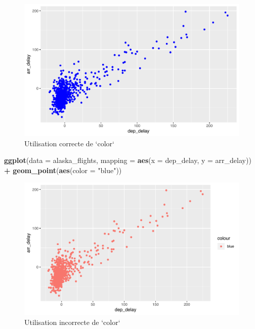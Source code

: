 \documentclass[a4paperpaper,]{article}
\newenvironment{Shaded}{\begin{snugshade}}{\end{snugshade}}
\newcommand{\KeywordTok}[1]{\textcolor[rgb]{0.13,0.29,0.53}{\textbf{#1}}}
\newcommand{\DataTypeTok}[1]{\textcolor[rgb]{0.13,0.29,0.53}{#1}}
\newcommand{\StringTok}[1]{\textcolor[rgb]{0.31,0.60,0.02}{#1}}
\newcommand{\OperatorTok}[1]{\textcolor[rgb]{0.81,0.36,0.00}{\textbf{#1}}}
\newcommand{\NormalTok}[1]{#1}
\theoremstyle{definition}
\theoremstyle{definition}
\theoremstyle{definition}
\theoremstyle{remark}
\begin{document}
\begin{figure}[htpb]

{\centering \includegraphics[width=0.9\linewidth]{figure/rightcolor-1} 

}

\caption{Utilisation correcte de `color`}\label{fig:rightcolor}
\end{figure}

\begin{Shaded}
\begin{Highlighting}[]
\KeywordTok{ggplot}\NormalTok{(}\DataTypeTok{data =}\NormalTok{ alaska_flights, }\DataTypeTok{mapping =} \KeywordTok{aes}\NormalTok{(}\DataTypeTok{x =}\NormalTok{ dep_delay, }\DataTypeTok{y =}\NormalTok{ arr_delay)) }\OperatorTok{+}
\StringTok{  }\KeywordTok{geom_point}\NormalTok{(}\KeywordTok{aes}\NormalTok{(}\DataTypeTok{color =} \StringTok{"blue"}\NormalTok{))}
\end{Highlighting}
\end{Shaded}

\begin{figure}[htpb]

{\centering \includegraphics[width=0.9\linewidth]{figure/wrongcolor-1} 

}

\caption{Utilisation incorrecte de `color`}\label{fig:wrongcolor}
\end{figure}
\end{document}

